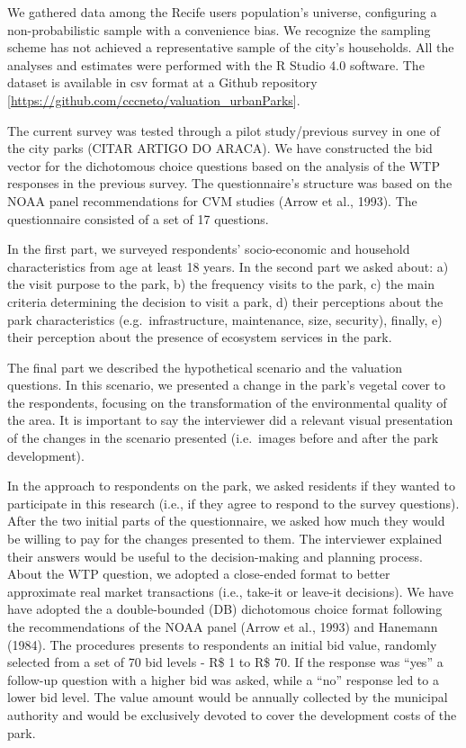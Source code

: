 \documentclass[smallextended]{svjour3}       %
\begin{document}
We gathered data among the Recife users population's universe,
configuring a non-probabilistic sample with a convenience bias. We
recognize the sampling scheme has not achieved a representative sample
of the city's households. All the analyses and estimates were performed
with the R Studio 4.0 software. The dataset is available in csv format
at a Github repository
{[}\url{https://github.com/cccneto/valuation_urbanParks}{]}.

The current survey was tested through a pilot study/previous survey in
one of the city parks (CITAR ARTIGO DO ARACA). We have constructed the
bid vector for the dichotomous choice questions based on the analysis of
the WTP responses in the previous survey. The questionnaire's structure
was based on the NOAA panel recommendations for CVM studies (Arrow et
al., 1993). The questionnaire consisted of a set of 17 questions.

In the first part, we surveyed respondents' socio-economic and household
characteristics from age at least 18 years. In the second part we asked
about: a) the visit purpose to the park, b) the frequency visits to the
park, c) the main criteria determining the decision to visit a park, d)
their perceptions about the park characteristics (e.g.~infrastructure,
maintenance, size, security), finally, e) their perception about the
presence of ecosystem services in the park.

The final part we described the hypothetical scenario and the valuation
questions. In this scenario, we presented a change in the park's vegetal
cover to the respondents, focusing on the transformation of the
environmental quality of the area. It is important to say the
interviewer did a relevant visual presentation of the changes in the
scenario presented (i.e.~images before and after the park development).

In the approach to respondents on the park, we asked residents if they
wanted to participate in this research (i.e., if they agree to respond
to the survey questions). After the two initial parts of the
questionnaire, we asked how much they would be willing to pay for the
changes presented to them. The interviewer explained their answers would
be useful to the decision-making and planning process. About the WTP
question, we adopted a close-ended format to better approximate real
market transactions (i.e., take-it or leave-it decisions). We have have
adopted the a double-bounded (DB) dichotomous choice format following
the recommendations of the NOAA panel (Arrow et al., 1993) and Hanemann
(1984). The procedures presents to respondents an initial bid value,
randomly selected from a set of 70 bid levels - R\$ 1 to R\$ 70. If the
response was ``yes'' a follow-up question with a higher bid was asked,
while a ``no'' response led to a lower bid level. The value amount would
be annually collected by the municipal authority and would be
exclusively devoted to cover the development costs of the park.
\end{document}
